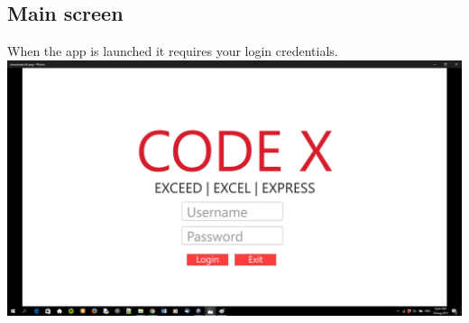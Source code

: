 \documentclass[a4paper,10pt]{article}
\begin{document}
	\subsection{Main screen}
	When the app is launched it requires your login credentials.\\
	{\centering\includegraphics[width=15cm, scale=0.5]{smarctsearch1.jpg}}
\end{document}
